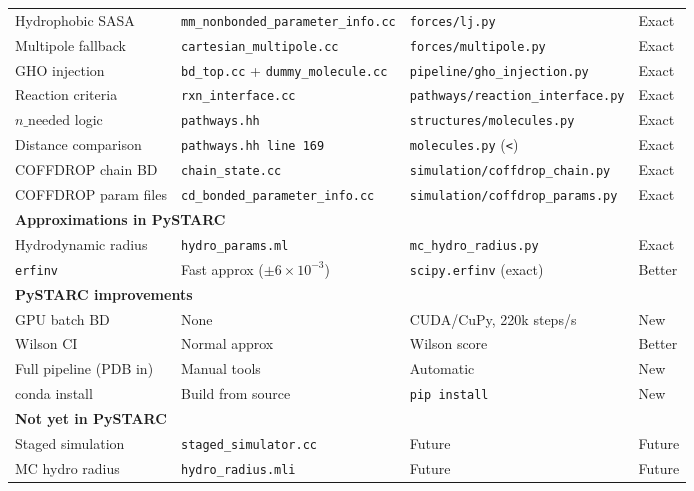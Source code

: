 \documentclass[12pt,a4paper]{article}
\begin{document}
\begin{longtable}{p{5cm}p{3.5cm}p{3.5cm}p{1.8cm}}
Hydrophobic SASA & \texttt{mm\_nonbonded\_parameter\_info.cc} & \texttt{forces/lj.py} & \textcolor{cgreen}{Exact}\\
Multipole fallback & \texttt{cartesian\_multipole.cc} & \texttt{forces/multipole.py} & \textcolor{cgreen}{Exact}\\
GHO injection & \texttt{bd\_top.cc} + \texttt{dummy\_molecule.cc} & \texttt{pipeline/gho\_injection.py} & \textcolor{cgreen}{Exact}\\
Reaction criteria & \texttt{rxn\_interface.cc} & \texttt{pathways/reaction\_interface.py} & \textcolor{cgreen}{Exact}\\
$n\_\mathrm{needed}$ logic & \texttt{pathways.hh} & \texttt{structures/molecules.py} & \textcolor{cgreen}{Exact}\\
Distance comparison & \texttt{pathways.hh line 169} & \texttt{molecules.py} (\texttt{<}) & \textcolor{cgreen}{Exact}\\
COFFDROP chain BD & \texttt{chain\_state.cc} & \texttt{simulation/coffdrop\_chain.py} & \textcolor{cgreen}{Exact}\\
COFFDROP param files & \texttt{cd\_bonded\_parameter\_info.cc} & \texttt{simulation/coffdrop\_params.py} & \textcolor{cgreen}{Exact}\\
\midrule
\multicolumn{4}{l}{\textbf{Approximations in PySTARC}}\\[2pt]
Hydrodynamic radius & \texttt{hydro\_params.ml} & \texttt{mc\_hydro\_radius.py} & \textcolor{cgreen}{Exact}\\
\texttt{erfinv} & Fast approx ($\pm6\times10^{-3}$) & \texttt{scipy.erfinv} (exact) & \textcolor{cblue}{Better}\\
\midrule
\multicolumn{4}{l}{\textbf{PySTARC improvements}}\\[2pt]
GPU batch BD & None & CUDA/CuPy, 220k steps/s & \textcolor{cblue}{New}\\
Wilson CI & Normal approx & Wilson score & \textcolor{cblue}{Better}\\
Full pipeline (PDB in) & Manual tools & Automatic & \textcolor{cblue}{New}\\
conda install & Build from source & \texttt{pip install} & \textcolor{cblue}{New}\\
\midrule
\multicolumn{4}{l}{\textbf{Not yet in PySTARC}}\\[2pt]

Staged simulation & \texttt{staged\_simulator.cc} & Future & \textcolor{cred}{Future}\\
MC hydro radius & \texttt{hydro\_radius.mli} & Future & \textcolor{cred}{Future}\\
\bottomrule
\end{longtable}
\end{document}
